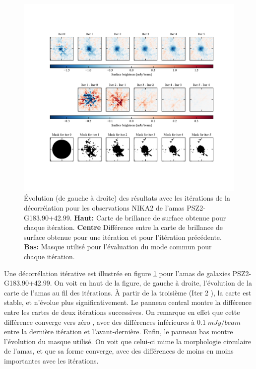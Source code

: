 \begin{figure}[t]
    \centering
    \includegraphics[width=.99\linewidth, trim={2cm 3cm 2cm 3cm}, clip]{Figures/Chap_decor/PSZ2G183_evol_iters.pdf}
    \caption{
        Évolution (de gauche à droite) des résultats avec les itérations de la décorrélation pour les observations NIKA2 de l'amas PSZ2-G183.90+42.99.
        \textbf{Haut:} Carte de brillance de surface obtenue pour chaque itération.
        \textbf{Centre} Différence entre la carte de brillance de surface obtenue pour une itération et pour l'itération précédente.
        \textbf{Bas:} Masque utilisé pour l'évaluation du mode commun pour chaque itération.
    }
    \label{fig:iter_decor}
\end{figure}

Une décorrélation itérative est illustrée en figure \ref{fig:iter_decor} pour l'amas de galaxies PSZ2-G183.90+42.99.
On voit en haut de la figure, de gauche à droite, l'évolution de la carte de l'amas au fil des itérations.
À partir de la troisième (\guillemotleft Iter 2 \guillemotright), la carte est stable, et n'évolue plus significativement.
Le panneau central montre la différence entre les cartes de deux itérations successives.
On remarque en effet que cette différence converge vers zéro , avec des différences inférieures à $0.1 \;\unit{mJy/beam}$ entre la dernière itération et l'avant-dernière.
Enfin, le panneau bas montre l'évolution du masque utilisé.
On voit que celui-ci mime la morphologie circulaire de l'amas, et que sa forme converge, avec des différences de moins en moins importantes avec les itérations.

